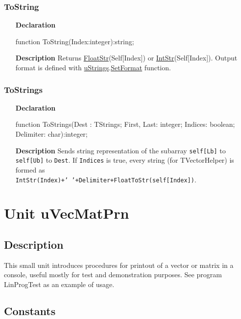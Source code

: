 \documentclass[12pt,a4paper,oneside]{report}
\newcommand{\lmath}[1]{   %
	\marginpar{\vspace{#1} 
		\begin{flushright}
			LMath
	\end{flushright} }
}
\newcommand{\declarationitem}[1]{\textbf{#1}}
\newcommand{\descriptiontitle}[1]{\textbf{#1}}
\newcommand{\code}[1]{\texttt{#1}}
\begin{document}
\subsubsection{ToString}
\begin{itemize}
	\item[\declarationitem{Declaration}\hfill]
	\begin{flushleft}
     function ToString(Index:integer):string;
	\end{flushleft}
	\item[\descriptiontitle{Description}\hfill]
	Returns \hyperref[ustrings-FloatStr]{FloatStr}(Self[Index]) or \hyperref[ustrings-IntStr]{IntStr}(Self[Index]). Output format is defined with \hyperref[ustrings]{uStrings}.\hyperref[ustrings-SetFormat]{SetFormat} function.
\end{itemize}
\subsubsection{ToStrings}
\begin{itemize}
	\item[\declarationitem{Declaration}\hfill]
	\begin{flushleft}
     function ToStrings(Dest : TStrings; First, Last: integer; Indices: boolean; Delimiter: char):integer;
	\end{flushleft}
	\item[\descriptiontitle{Description}\hfill]
     Sends string representation of the subarray \code{self[Lb]} to \code{self[Ub]} to \code{Dest}. If \code{Indices} is true, every string (for TVectorHelper) is formed as \\
     \code{IntStr(Index)+' '+Delimiter+FloatToStr(self[Index])}.
\end{itemize}

\section{Unit uVecMatPrn}\lmath{-28pt}
\label{uvecmatprn}
\subsection{Description}
This small unit introduces procedures for printout of a vector or matrix in a console, useful mostly for test and demonstration purposes. See program LinProgTest as an example of usage.
\subsection{Constants}
\end{document}
